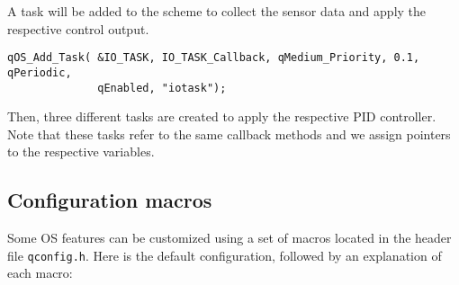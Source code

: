 

A task will be added to the scheme to collect the sensor data and apply the respective control output. 
\medskip

\begin{lstlisting}[style=CStyle]
qOS_Add_Task( &IO_TASK, IO_TASK_Callback, qMedium_Priority, 0.1, qPeriodic, 
              qEnabled, "iotask");
\end{lstlisting}



Then, three different tasks are created to apply the respective PID controller. Note that these tasks refer to the same callback methods and we assign pointers to the respective variables. 
\medskip





\newpage

\subsection{Configuration macros}
Some  OS features can be customized using a set of macros located in the header file \lstinline{qconfig.h}. Here is the default configuration, followed by an explanation of each macro: 
\medskip

